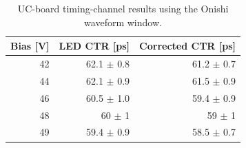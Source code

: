 \begin{table}[htbp]
\centering
\small
\begin{tabular}{rrr}
\toprule
Bias [V] & LED CTR [ps] & Corrected CTR [ps] \\
\midrule
42 & 62.1 $\pm$ 0.8 & 61.2 $\pm$ 0.7 \\
44 & 62.1 $\pm$ 0.9 & 61.5 $\pm$ 0.9 \\
46 & 60.5 $\pm$ 1.0 & 59.4 $\pm$ 0.9 \\
48 & 60 $\pm$ 1 & 59 $\pm$ 1 \\
49 & 59.4 $\pm$ 0.9 & 58.5 $\pm$ 0.7 \\
\bottomrule
\end{tabular}
\caption{UC-board timing-channel results using the Onishi waveform window.}
\label{tab:uc-timing-onishi}
\end{table}
